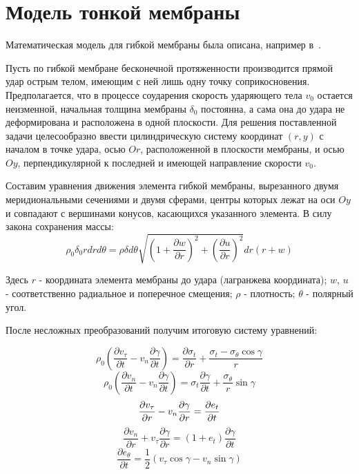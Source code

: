 \section{Модель тонкой мембраны}\label{sec:eq-membrane}
Математическая модель для гибкой мембраны была описана, например в~\cite{rakhmatulin}.

Пусть по гибкой мембране бесконечной протяженности производится прямой удар острым телом, имеющим с ней лишь одну
точку соприкосновения.
Предполагается, что в процессе соударения скорость ударяющего тела $v_0$ остается неизменной, начальная толщина
мембраны $\delta_0$ постоянна, а сама она до удара не деформирована и расположена в одной плоскости.
Для решения поставленной задачи целесообразно ввести цилиндрическую систему координат $(r,y)$ с началом в точке удара,
осью $Or$, расположенной в плоскости мембраны, и осью $Oy$, перпендикулярной к последней и имеющей направление скорости
$v_0$.

Составим уравнения движения элемента гибкой мембраны, вырезанного двумя меридиональными сечениями и двумя сферами,
центры которых лежат на оси $Oy$ и совпадают с вершинами конусов, касающихся указанного элемента.
В силу закона сохранения массы:
\begin{equation}
    \rho_0 \delta_0 r dr d\theta = \rho \delta d\theta \sqrt{\left( 1 + \dfrac{\partial w}{\partial r} \right) ^ 2 + \left( \dfrac{\partial u}{\partial r} \right) ^ 2} dr (r + w)
\end{equation}

Здесь $r$ - координата элемента мембраны до удара (лагранжева координата); $w$, $u$ - соответственно радиальное и
поперечное смещения; $\rho$ - плотность; $\theta$ - полярный угол.

После несложных преобразований получим итоговую систему уравнений:

\begin{equation}
    \rho_0 \left( \dfrac{\partial v_{\tau}}{\partial t} - v_n \dfrac{\partial \gamma}{\partial t} \right) = \dfrac{\partial \sigma_t}{\partial r} + \dfrac{\sigma_t - \sigma_{\theta} \cos{\gamma}}{r}
\end{equation}
\begin{equation}
    \rho_0 \left( \dfrac{\partial v_n}{\partial t} - v_n \dfrac{\partial \gamma}{\partial t} \right) = \sigma_t \dfrac{\partial \gamma}{\partial t} + \dfrac{\sigma_{\theta}}{r} \sin{\gamma}
\end{equation}
\begin{equation}
    \dfrac{\partial v_{\tau}}{\partial r} - v_n \dfrac{\partial \gamma}{\partial r} = \dfrac{\partial e_t}{\partial t} \\
\end{equation}
\begin{equation}
    \dfrac{\partial v_n}{\partial r} + v_{\tau} \dfrac{\partial \gamma}{\partial r} = \left( 1 + e_t \right) \dfrac{\partial \gamma}{\partial t}
\end{equation}
\begin{equation}
    \dfrac{\partial e_{\theta}}{\partial t} = \dfrac{1}{2} \left( v_{\tau} \cos{\gamma} - v_n \sin{\gamma} \right)
\end{equation}


